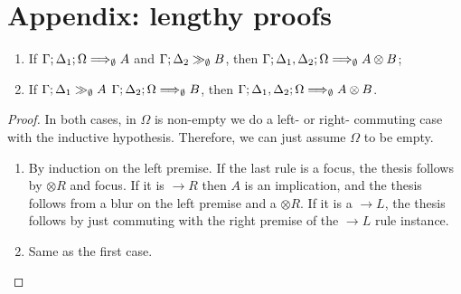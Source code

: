 \section{Appendix: lengthy proofs}

\begin{lemma}\label{otimeslemma}\mbox{}
  \begin{enumerate}
  \item If $\Gamma; \Delta_1; \Omega \Longrightarrow_{\emptyset} A$ and
    $\Gamma; \Delta_2 \gg_{\emptyset} B$, then
    $\Gamma; \Delta_1, \Delta_2; \Omega \Longrightarrow_{\emptyset} A \otimes B$;
  \item If $\Gamma; \Delta_1 \gg_{\emptyset} A$
    $\Gamma; \Delta_2; \Omega \Longrightarrow_{\emptyset} B$, then
    $\Gamma; \Delta_1, \Delta_2; \Omega \Longrightarrow_{\emptyset} A \otimes B$.
  \end{enumerate}
\end{lemma}
\begin{proof}
  In both cases, in $\Omega$ is non-empty we do a left- or right- commuting case
  with the inductive hypothesis. Therefore, we can just assume $\Omega$ to be
  empty.

  \begin{enumerate}
  \item

    By induction on the left premise. If the last rule is a focus, the thesis
    follows by $\otimes R$ and focus. If it is $\rightarrow R$ then $A$ is an
    implication, and the thesis follows from a blur on the left premise and a
    $\otimes R$. If it is a $\rightarrow L$, the thesis follows by just
    commuting with the right premise of the $\rightarrow L$ rule instance.

  \item Same as the first case.

  \end{enumerate}
\end{proof}


